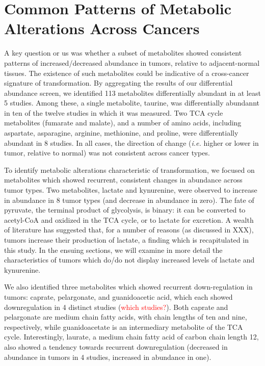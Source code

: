\documentclass[10pt]{article}
\begin{document}
\section{ Common Patterns of Metabolic Alterations Across Cancers}
A key question or us was whether a subset of metabolites showed consistent patterns of increased/decreased abundance in tumors, relative to adjacent-normal tissues. The existence of such metabolites could be indicative of a cross-cancer signature of transformation. By aggregating the results of our differential abundance screen, we identified 113 metabolites differentially abundant in at least 5 studies. Among these, a single metabolite, taurine, was differentially abundannt in ten of the twelve studies in which it was measured. Two TCA cycle metabolites (fumarate and malate), and a number of amino acids, including aspartate, asparagine, arginine, methionine, and proline, were differentially abundant in 8 studies. In all cases, the direction of change (\textit{i.e.} higher or lower in tumor, relative to normal) was not consistent across cancer types.

To identify metabolic alterations characteristic of transformation, we focused on metabolites which showed recurrent, consistent changes in abundance across tumor types. Two metabolites, lactate and kynurenine, were observed to increase in abundance in 8 tumor types (and decrease in abundance in zero). The fate of pyruvate, the terminal product of glycolysis, is binary: it can be converted to acetyl-CoA and oxidized in the TCA cycle, or to lactate for excretion. A wealth of literature has suggested that, for a number of reasons (as discussed in XXX), tumors increase their production of lactate, a finding which is recapitulated in this study. In the ensuing sections, we will examine in more detail the characteristics of tumors which do/do not display increased levels of lactate and kynurenine. 

We also identified three metabolites which showed recurrent down-regulation in tumors: caprate, pelargonate, and guanidoacetic acid, which each showed downregulation in 4 distinct studies (\textcolor{red}{which studies?}). Both caprate and pelargonate are medium chain fatty acids, with chain lengths of ten and nine, respectively, while guanidoacetate is an intermediary metabolite of the TCA cycle. Interestingly, laurate, a medium chain fatty acid of carbon chain length 12, also showed a tendency towards recurrent downregulation (decreased in abundance in tumors in 4 studies, increased in abundance in one). 
\end{document}
